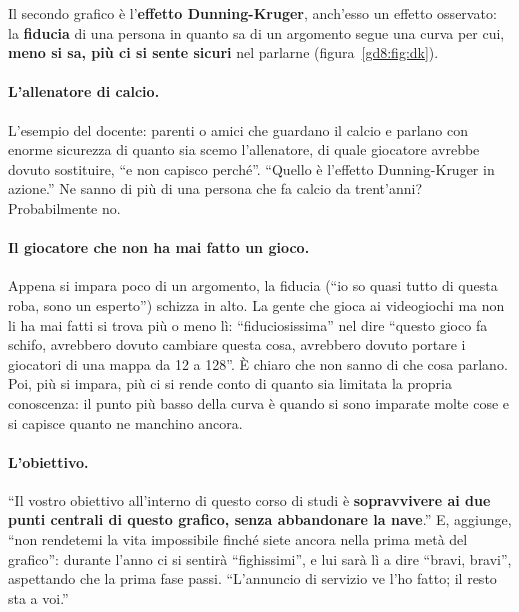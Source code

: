 Il secondo grafico è l'\textbf{effetto Dunning-Kruger}, anch'esso un effetto
osservato: la \textbf{fiducia} di una persona in quanto sa di un argomento
segue una curva per cui, \textbf{meno si sa, più ci si sente sicuri} nel
parlarne (figura~\ref{gd8:fig:dk}).

\paragraph{L'allenatore di calcio.} L'esempio del docente: parenti o amici che
guardano il calcio e parlano con enorme sicurezza di quanto sia scemo
l'allenatore, di quale giocatore avrebbe dovuto sostituire, ``e non capisco
perché''. ``Quello è l'effetto Dunning-Kruger in azione.'' Ne sanno di più di
una persona che fa calcio da trent'anni? Probabilmente no.

\paragraph{Il giocatore che non ha mai fatto un gioco.} Appena si impara poco
di un argomento, la fiducia (``io so quasi tutto di questa roba, sono un
esperto'') schizza in alto. La gente che gioca ai videogiochi ma non li ha mai
fatti si trova più o meno lì: ``fiduciosissima'' nel dire ``questo gioco fa
schifo, avrebbero dovuto cambiare questa cosa, avrebbero dovuto portare i
giocatori di una mappa da 12 a 128''. È chiaro che non sanno di che cosa
parlano. Poi, più si impara, più ci si rende conto di quanto sia limitata la
propria conoscenza: il punto più basso della curva è quando si sono imparate
molte cose e si capisce quanto ne manchino ancora.

\paragraph{L'obiettivo.} ``Il vostro obiettivo all'interno di questo corso di
studi è \textbf{sopravvivere ai due punti centrali di questo grafico, senza
abbandonare la nave}.'' E, aggiunge, ``non rendetemi la vita impossibile
finché siete ancora nella prima metà del grafico'': durante l'anno ci si
sentirà ``fighissimi'', e lui sarà lì a dire ``bravi, bravi'', aspettando che
la prima fase passi. ``L'annuncio di servizio ve l'ho fatto; il resto sta a
voi.''

